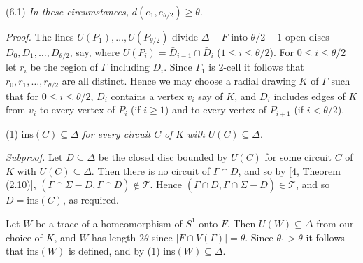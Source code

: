 \stmt
(6.1) \textit{In these circumstances,}  $d(e_1, e_{\theta/2}) \ge \theta$.

\textit{Proof.} The lines $U(P_1), \dots, U(P_{\theta/2})$ divide $\Delta - F$ into $\theta/2 + 1$ open discs $D_0, D_1, \dots, D_{\theta/2}$, say, where $U(P_i) = \bar{D}_{i-1} \cap \bar{D}_i$ ($1 \le i \le \theta/2$). For $0 \le i \le \theta/2$ let $r_i$ be the region of $\Gamma$ including $D_i$. Since $\Gamma_1$ is 2-cell it follows that $r_0, r_1, \dots, r_{\theta/2}$ are all distinct. Hence we may choose a radial drawing $K$ of $\Gamma$ such that for $0 \le i \le \theta/2$, $D_i$ contains a vertex $v_i$ say of $K$, and $D_i$ includes edges of $K$ from $v_i$ to every vertex of $P_i$ (if $i \ge 1$) and to every vertex of $P_{i+1}$ (if $i < \theta/2$). 

\hspace*{12pt}(1) $\text{ins}(C) \subseteq \Delta$ \textit{for every circuit} $C$ \textit{of} $K$ \textit{with} $U(C) \subseteq \Delta$.

\textit{Subproof.} Let $D \subseteq \Delta$ be the closed disc bounded by $U(C)$ for some circuit $C$ of $K$ with $U(C) \subseteq \Delta$. Then there is no circuit of $\Gamma \cap D$, and so by [4, Theorem (2.10)], $(\Gamma \cap \overline{\Sigma - D}, \Gamma \cap D) \notin \mathscr{T}$. Hence $(\Gamma \cap D, \Gamma \cap \overline{\Sigma - D}) \in \mathscr{T}$, and so $D = \text{ins}(C)$, as required.

Let $W$ be a trace of a homeomorphism of $S^1$ onto $F$. Then $U(W) \subseteq \Delta$ from our choice of $K$, and $W$ has length $2\theta$ since $|F \cap V(\Gamma)| = \theta$. Since $\theta_1 > \theta$ it follows that $\text{ins}(W)$ is defined, and by (1) $\text{ins}(W) \subseteq \Delta$.

